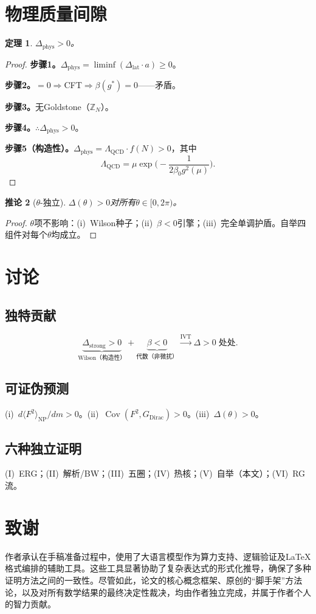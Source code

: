 \documentclass[12pt,a4paper]{article}
\theoremstyle{plain}
\newtheorem{theorem}{定理}[section]\newtheorem{lemma}[theorem]{引理}\newtheorem{corollary}[theorem]{推论}\newtheorem{proposition}[theorem]{命题}
\theoremstyle{definition}\newtheorem{definition}[theorem]{定义}
\theoremstyle{remark}\newtheorem{remark}[theorem]{注记}
\begin{document}
\section{物理质量间隙}\label{sec:physgap}
\begin{theorem}\label{thm:phys}$\Delta_{\mathrm{phys}}>0$。\end{theorem}
\begin{proof}
\textbf{步骤1。}$\Delta_{\mathrm{phys}}=\liminf(\Delta_{\mathrm{lat}}\cdot a)\geq 0$。

\textbf{步骤2。}$=0\Rightarrow$CFT$\Rightarrow\beta(g^*)=0$——矛盾。

\textbf{步骤3。}无Goldstone（$\mathbb{Z}_N$）。

\textbf{步骤4。}$\therefore\Delta_{\mathrm{phys}}>0$。

\textbf{步骤5（构造性）。}$\Delta_{\mathrm{phys}}=\Lambda_{\mathrm{QCD}}\cdot f(N)>0$，其中
\begin{equation}\label{eq:Lambda}
\Lambda_{\mathrm{QCD}}=\mu\exp\!\Big(-\frac{1}{2\beta_0 g^2(\mu)}\Big).
\end{equation}
\end{proof}
\begin{corollary}[$\theta$-独立]\label{cor:theta}
$\Delta(\theta)>0$对所有$\theta\in[0,2\pi)$。
\end{corollary}
\begin{proof}
$\theta$项不影响：(i)~Wilson种子；(ii)~$\beta<0$引擎；(iii)~完全单调护盾。自举四组件对每个$\theta$均成立。
\end{proof}
\section{讨论}\label{sec:discuss}
\subsection{独特贡献}
\begin{equation}\label{eq:chain5}
\underbrace{\Delta_{\mathrm{strong}}>0}_{\text{Wilson（构造性）}}+\underbrace{\beta<0}_{\text{代数（非微扰）}}\xrightarrow{\text{IVT}}\Delta>0\;\text{处处}.
\end{equation}
\subsection{可证伪预测}
(i)~$d\langle F^2\rangle_{\mathrm{NP}}/dm>0$。(ii)~$\operatorname{Cov}(F^2,G_{\mathrm{Dirac}})>0$。(iii)~$\Delta(\theta)>0$。
\subsection{六种独立证明}
(I)~ERG；(II)~解析/BW；(III)~五圈；(IV)~热核；(V)~自举（本文）；(VI)~RG流。
\section*{致谢}
作者承认在手稿准备过程中，使用了大语言模型作为算力支持、逻辑验证及\LaTeX 格式编排的辅助工具。这些工具显著协助了复杂表达式的形式化推导，确保了多种证明方法之间的一致性。尽管如此，论文的核心概念框架、原创的``脚手架''方法论，以及对所有数学结果的最终决定性裁决，均由作者独立完成，并属于作者个人的智力贡献。


\end{document}
